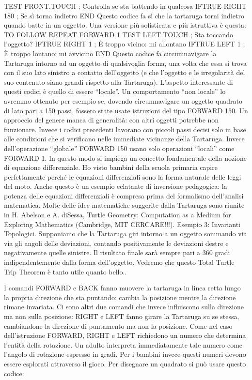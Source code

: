 { TEST FRONT.TOUCH	; Controlla se sta battendo in qualcosa
 IFTRUE RIGHT 180	; Se sì torna indietro
END
Questo codice fa sì che la tartaruga torni indietro quando batte in un oggetto. Una versione più sofisticata e più istruttiva è questa:
TO FOLLOW
REPEAT
  FORWARD 1
  TEST LEFT.TOUCH	; Sta toccando l'oggetto?
  IFTRUE RIGHT 1	; È troppo vicino: mi allontano
  IFTRUE LEFT 1	; È troppo lontano: mi avvicino
END
Questo codice fa circumnavigare la Tartaruga intorno ad un oggetto di qualsivoglia forma, una volta che essa si trova con il suo lato sinistro a contatto dell'oggetto (e che l'oggetto e le irregolarità del suo contenuto siano grandi rispetto alla Tartaruga).
L'aspetto interessante di questi codici è quello di essere “locale”. Un comportamento “non locale” lo avremmo ottenuto per esempio se, dovendo circumnavigare un oggetto quadrato di lato pari a 150 passi, fossero state usate istruzioni del tipo FORWARD 150. Un approccio del genere manca di generalità: con altri oggetti potrebbe non funzionare. Invece i codici precedenti lavorano con piccoli passi decisi solo in base alle condizioni che si verificano nelle immediate vicinanze della Tartaruga. Invece dell'operazione “globale” FORWARD 150 usano solo operazioni “locali” come FORWARD 1.  In questo modo si impiega un concetto fondamentale della nozione di equazione differenziale. Ho visto bambini della scuola primaria capire perfettamente perché le equazioni differenziali sono la forma naturale delle leggi del moto. Anche questo è un esempio eclatante di inversione pedagogica: la potenza delle equazioni differenziali è compresa prima del formalismo dell'analisi matematica. Molte delle idee matematiche suggerite dalla Tartaruga sono riunite in H. Abelson e A. diSessa, Turtle Geometry: Computation as a Medium for Exploring Mathematics (Cambridge, MIT CERCARE!!!).
Esempio 3: Invarianti Topologici. Supponiamo che la Tartaruga giri intorno a un oggetto sommando via via gli angoli delle deviazioni, contando positivamente le deviazioni destre e negativamente quelle sinistre. Il risultato finale sarà sempre pari a 360 gradi indipendentemente dalla forma dell'oggetto. Vedremo che questo Total Turtle Trip Theorem è tanto utile quanto bello.}. 

I comandi FORWARD e BACK fanno muovere la tartaruga in linea retta lungo la propria direzione che sta puntando: cambia la posizione mentre la direzione rimane invariata. Ci sono altri due comandi che invece influiscono sulla direzione ma non sulla posizione: RIGHT  e LEFT fanno girare la Tartaruga su se stessa, cambiandone la direzione di puntamento ma non la posizione. Come nel caso dell'istruzione FORWARD, RIGHT e LEFT richiedono un numero che determina l'entità della rotazione. Un adulto interpreta immediatamente tale numero come l'angolo di rotazione espresso in gradi. Per i bambini invece questi numeri devono essere esplorati attraverso il gioco. 
Per disegnare un quadrato si può usare questo codice:

